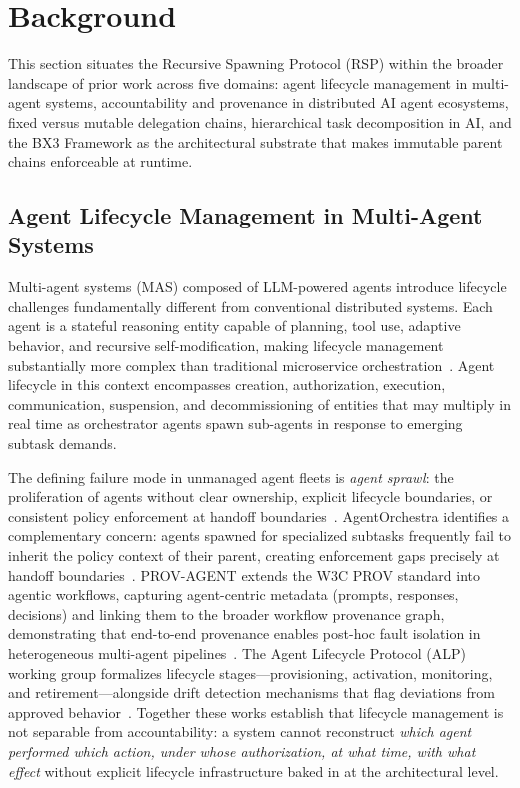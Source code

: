 \section{Background}
\label{sec:background}

This section situates the Recursive Spawning Protocol (RSP) within the broader landscape of prior work across five domains: agent lifecycle management in multi-agent systems, accountability and provenance in distributed AI agent ecosystems, fixed versus mutable delegation chains, hierarchical task decomposition in AI, and the BX3 Framework as the architectural substrate that makes immutable parent chains enforceable at runtime.

\subsection{Agent Lifecycle Management in Multi-Agent Systems}
\label{sec:lifecycle}

Multi-agent systems (MAS) composed of LLM-powered agents introduce lifecycle challenges fundamentally different from conventional distributed systems. Each agent is a stateful reasoning entity capable of planning, tool use, adaptive behavior, and recursive self-modification, making lifecycle management substantially more complex than traditional microservice orchestration~\cite{moore2025hmas}. Agent lifecycle in this context encompasses creation, authorization, execution, communication, suspension, and decommissioning of entities that may multiply in real time as orchestrator agents spawn sub-agents in response to emerging subtask demands.

The defining failure mode in unmanaged agent fleets is \emph{agent sprawl}: the proliferation of agents without clear ownership, explicit lifecycle boundaries, or consistent policy enforcement at handoff boundaries~\cite{moore2025hmas}. AgentOrchestra identifies a complementary concern: agents spawned for specialized subtasks frequently fail to inherit the policy context of their parent, creating enforcement gaps precisely at handoff boundaries~\cite{agentorchestra2025}. PROV-AGENT extends the W3C PROV standard into agentic workflows, capturing agent-centric metadata (prompts, responses, decisions) and linking them to the broader workflow provenance graph, demonstrating that end-to-end provenance enables post-hoc fault isolation in heterogeneous multi-agent pipelines~\cite{prov-agent2025}. The Agent Lifecycle Protocol (ALP) working group formalizes lifecycle stages---provisioning, activation, monitoring, and retirement---alongside drift detection mechanisms that flag deviations from approved behavior~\cite{alp2025}. Together these works establish that lifecycle management is not separable from accountability: a system cannot reconstruct \emph{which agent performed which action, under whose authorization, at what time, with what effect} without explicit lifecycle infrastructure baked in at the architectural level.


